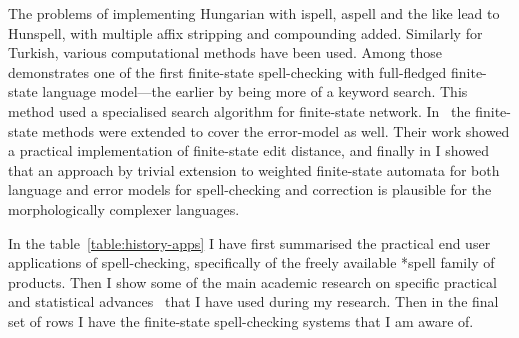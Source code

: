 \documentclass[officiallayout,draft]{unihelcompling}
\begin{document}
The problems of implementing Hungarian with ispell, aspell and the like lead to
Hunspell, with multiple affix stripping and compounding added. Similarly for
Turkish, various computational methods have been used. Among
those~\citet{oflazer1996errortolerant} demonstrates one of the first
finite-state spell-checking with full-fledged finite-state language model---the
earlier by \citep{aho1975efficient} being more of a keyword search. This method
used a specialised search algorithm for finite-state network.
In~\citet{agata2002typographical} the finite-state methods were extended to
cover the error-model as well. Their work showed a practical implementation of
finite-state edit distance, and finally in  I
showed that an approach by trivial extension to weighted finite-state automata
for both language and error models for spell-checking and correction is
plausible for the morphologically complexer languages.


In the table~\ref{table:history-apps} I have first summarised the practical
end user applications of spell-checking, specifically of the freely available
*spell family of products. Then I show some of  the main academic research
on specific practical and statistical advances~\cite{al2006learning} that I
have used during my research. Then in the final set of rows I have the
finite-state spell-checking systems that I am aware of.
\end{document}
